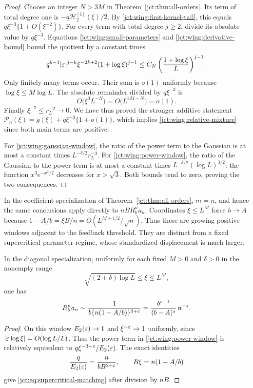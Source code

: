 \begin{proof}
Choose an integer $N>3M$ in Theorem~\ref{jct:thm:all-orders}.
Its term of total degree one is
$-q\mathcal H_2^{[1]}(\xi)/2$.  By
\eqref{jct:wing:first-kernel-tail}, this equals
$q\xi^{-3}\{1+O(\xi^{-2})\}$.
For every term with total degree $j\ge2$, divide its absolute
value by $q\xi^{-3}$.  Equations
\eqref{jct:wing:small-parameters} and \eqref{jct:wing:derivative-bound}
bound the quotient by a constant times
\[
 q^{k-1}|\varepsilon|^{j-k}
       \xi^{-2k+2}(1+\log\xi)^{j-1}
 \le C_N\left(\frac{1+\log\xi}{L}\right)^{j-1}.
\]
Only finitely many terms occur.  Their sum is $o(1)$ uniformly
because $\log\xi\le M\log L$.
The absolute remainder divided by $q\xi^{-3}$ is
\[
 O\bigl(\xi^3L^{-N}\bigr)=O\bigl(L^{3M-N}\bigr)=o(1).
\]
Finally $\xi^{-2}\le r_L^{-2}\to0$.
We have thus proved the stronger additive statement
$\mathcal P_n(\xi)=g(\xi)+q\xi^{-3}\{1+o(1)\}$,
which implies \eqref{jct:wing:relative-mixture} since both main terms
are positive.

For \eqref{jct:wing:gaussian-window}, the ratio of the power term to
the Gaussian is at most a constant times
$L^{-\delta/2}r_L^{-3}$.  For \eqref{jct:wing:power-window}, the
ratio of the Gaussian to the power term is at most a constant
times $L^{-\delta/2}(\log L)^{3/2}$: the function
$x^3e^{-x^2/2}$ decreases for $x>\sqrt3$.
Both bounds tend to zero, proving the two consequences.
\end{proof}

In the coefficient specialization of Theorem~\ref{jct:thm:all-orders},
$m=n$, and hence the same conclusions apply directly to
$nBR_b^n a_n$.  Coordinates $\xi\le L^M$ force $b\to A$
because $1-A/b=\xi B/n=O(L^{M+1/2}/\sqrt n)$.
Thus these are growing positive windows adjacent to the feedback
threshold.  They are distinct from a fixed supercritical parameter
regime, whose standardized displacement is much larger.

\begin{corollary}
\label{jct:cor:supercritical-matching}
In the diagonal specialization, uniformly for each fixed $M>0$ and
$\delta>0$ in the nonempty range
\[
 \sqrt{(2+\delta)\log L}\le\xi\le L^M,
\]
one has
\begin{equation}\label{jct:eq:supercritical-matching}
 R_b^n a_n\sim
 \frac1{b\{n(1-A/b)\}^{3+\varepsilon}}
 =\frac{b^{s-1}}{(b-A)^s}\,n^{-s}.
\end{equation}
\end{corollary}
\begin{proof}
On this window $E_2(\varepsilon)\to1$ and
$\xi^{-\varepsilon}\to1$ uniformly, since
$|\varepsilon\log\xi|=O(\log L/L)$. Thus the power term in
\eqref{jct:wing:power-window} is relatively equivalent to
$q\xi^{-3-\varepsilon}/E_2(\varepsilon)$. The exact identities
\[
 \frac{q}{E_2(\varepsilon)}=\frac{n}{bB^{2+\varepsilon}},\qquad
 B\xi=n(1-A/b)
\]
give \eqref{jct:eq:supercritical-matching} after division by $nB$.
\end{proof}

